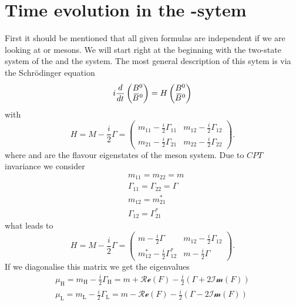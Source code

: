 \section{Time evolution in the \Bz-\Bzb sytem}

First it should be mentioned that all given formulas are independent if we are looking at \Bz or \Bs mesons. We will start right at the beginning with the two-state system of the \Bz and the \Bzb system. The most general description of this sytem is via
the Schrödinger equation
\begin{equation}
i\frac{d}{dt}\begin{pmatrix} B^0 \\ {\kern 0.18em\overline{\kern -0.18em B}{}{}^{\kern 0.06em 0}} \end{pmatrix} = H \begin{pmatrix} B^0 \\ {\kern 0.18em\overline{\kern -0.18em B}{}{}^{\kern 0.06em 0}} \end{pmatrix}
\end{equation}
with
\begin{equation}
    H = M-\frac{i}{2}\Gamma = \begin{pmatrix} m_{11}-\frac{i}{2}\Gamma_{11} & m_{12}-\frac{i}{2}\Gamma_{12} \\
                                              m_{21}-\frac{i}{2}\Gamma_{21} & m_{22}-\frac{i}{2}\Gamma_{22} \end{pmatrix}.
\end{equation}
where \Bz and \Bzb are the flavour eigenstates of the \B meson system. Due to $CPT$ invariance we consider
\begin{align}
    &m_{11} = m_{22} = m\\
    &\Gamma_{11} = \Gamma_{22} = \Gamma\\
    &m_{12} = m_{21}^*\\
    &\Gamma_{12} = \Gamma_{21}^*
\end{align}
what leads to
\begin{equation}
    H = M-\frac{i}{2}\Gamma = \begin{pmatrix} m-\frac{i}{2}\Gamma & m_{12}-\frac{i}{2}\Gamma_{12} \\
                                              m_{12}^*-\frac{i}{2}\Gamma_{12}^* & m-\frac{i}{2}\Gamma \end{pmatrix}.
\end{equation}
If we diagonalise this matrix we get the eigenvalues
\begin{align}
    \mu_{\text{H}} = m_{\text{H}}-\frac{i}{2}\Gamma_{\text{H}} = m+\mathcal{Re}(F)-\frac{i}{2}\left(\Gamma + 2\mathcal{Im}(F)\right)\\
    \mu_{\text{L}} = m_{\text{L}}-\frac{i}{2}\Gamma_{\text{L}} = m-\mathcal{Re}(F)-\frac{i}{2}\left(\Gamma - 2\mathcal{Im}(F)\right)
\end{align}

